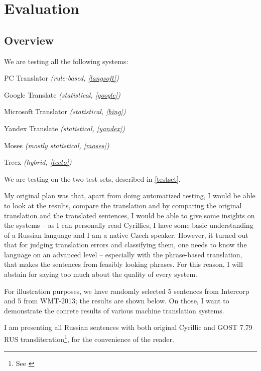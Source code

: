 \chapter{Evaluation}
\section{Overview}
\label{overvieweval}
We are testing all the following systems:
\begin{pitemize}
\item PC Translator \emph{(rule-based, \ref{langsoft})}
\item Google Translate \emph{(statistical, \ref{google})}
\item Microsoft Translator \emph{(statistical, \ref{bing})}
\item Yandex Translate \emph{(statistical, \ref{yandex})}
\item Moses \emph{(mostly statistical, \ref{moses})}
\item Treex \emph{(hybrid, \ref{tecto})}
\end{pitemize}

We are testing on the two test sets, described in \ref{testset}.

My original plan was that, apart from doing automatized testing, I would be able to look at the results, compare the translation and by comparing the original translation and the translated sentences, I would be able to give some insights on the systems -- as I can personally read Cyrillics, I have some basic understanding of a Russian language and I am a native Czech speaker. However, it turned out that for judging translation errors and classifying them, one needs to know the language on an advanced level -- especially with the phrase-based translation, that makes the sentences from feasibly looking phrases. For this reason, I will abstain for saying too much about the quality of every system.

For illustration purposes, we have randomly selected 5 sentences from Intercorp and 5 from WMT-2013; the results are shown below. 
On those, I want to demonstrate the conrete results of various machine translation systems. 

I am presenting all Russian sentences with both original Cyrillic and GOST 7.79 RUS transliteration\footnote{See \cite{gost}}, for the convenience of the reader.

